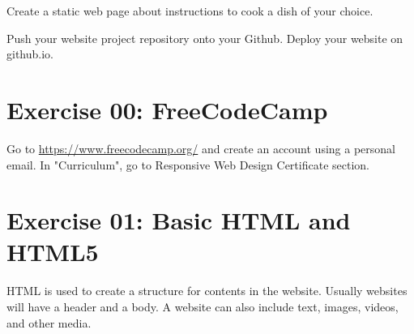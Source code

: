 \documentclass{42-en}
\begin{document}
Create a static web page about instructions to cook a dish of your choice.\par
\vspace{0.2in}
Push your website project repository onto your Github. Deploy your website on github.io.
    



\chapter{Exercise 00: FreeCodeCamp}

\exnumber{\exercicenumber}

\makeheaderfiles

Go to \url{https://www.freecodecamp.org/} and create an account using a personal email. In "Curriculum", go to Responsive Web Design Certificate section.


\chapter{Exercise 01: Basic HTML and HTML5}

\exnumber{\exercicenumber}

\makeheaderfiles

HTML is used to create a structure for contents in the website. Usually websites will have a header and a body. A website can also include text, images, videos, and other media.
\end{document}
